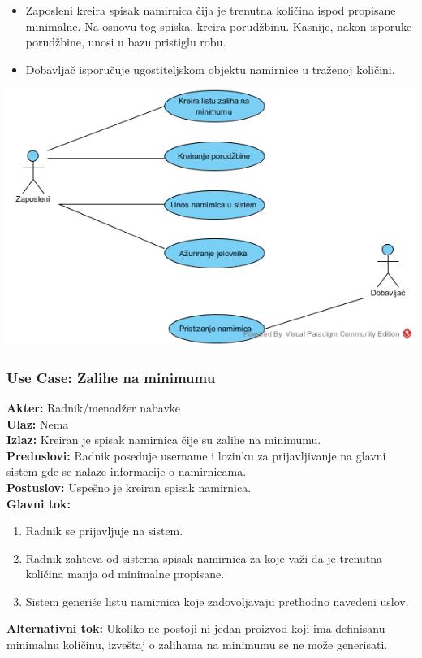 \documentclass{article}
\begin{document}
\begin{itemize}
\item Zaposleni kreira spisak namirnica čija je trenutna količina ispod propisane minimalne. Na osnovu tog spiska, kreira porudžbinu. Kasnije, nakon isporuke porudžbine, unosi u bazu pristiglu robu.
\item Dobavljač isporučuje ugostiteljskom objektu namirnice u traženoj količini.
\end{itemize}
\includegraphics[width=\textwidth]{SU_1_zalihe.png}
\subsubsection{\textbf{Use Case}: Zalihe na minimumu}
\textbf{Akter:} Radnik/menadžer nabavke\\
\textbf{Ulaz:} Nema\\
\textbf{Izlaz:} Kreiran je spisak namirnica čije su zalihe na minimumu.\\
\textbf{Preduslovi:} Radnik poseduje username i lozinku za prijavljivanje na glavni sistem gde se nalaze informacije o namirnicama.\\
\textbf{Postuslov:} Uspešno je kreiran spisak namirnica.\\
\textbf{Glavni tok:} 
\begin{enumerate}
	\item Radnik se prijavljuje na sistem.
	\item Radnik zahteva od sistema spisak namirnica za koje važi da je trenutna količina manja od minimalne propisane.
	\item Sistem generiše listu namirnica koje zadovoljavaju prethodno navedeni uslov.
\end{enumerate}
\textbf{Alternativni tok:} Ukoliko ne postoji ni jedan proizvod koji ima definisanu minimalnu količinu, izveštaj o zalihama na minimumu se ne može generisati.\\
\end{document}
